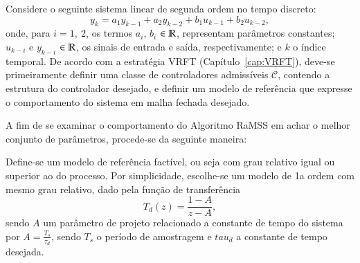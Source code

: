 \begin{exmp}\label{ex:sis2aord}
    Considere o seguinte sistema linear de segunda ordem no tempo discreto:
    \begin{equation}
    \label{eq:sis2aord}
        y_k = a_1y_{k-1} + a_2y_{k-2} + b_1u_{k-1} + b_2u_{k-2},
    \end{equation}
    onde, para $i = 1,\ 2$, os termos $a_i$, $b_i$ $\in \mathbb{R}$, representam parâmetros constantes; $u_{k-i}$ e $y_{k-i}$ $\in \mathbb{R}$, os sinais de entrada e saída, respectivamente; e $k$ o índice temporal.
    De acordo com a estratégia VRFT (Capítulo~\ref{cap:VRFT}), deve-se primeiramente definir uma classe de controladores admissíveis $\mathscr{C}$, contendo a estrutura do controlador desejado, e definir um modelo de referência que expresse o comportamento do sistema em malha fechada desejado.

    A fim de se examinar o comportamento do Algoritmo RaMSS em achar o melhor conjunto de parâmetros, procede-se da seguinte maneira:

    Define-se um modelo de referência 
    factível, ou seja com grau relativo igual ou superior ao do processo. Por simplicidade, escolhe-se um modelo de 1a ordem com mesmo grau relativo, dado pela função de transferência
 \begin{equation}
    T_d(z) = \frac{1-A}{z-A},
    \label{eq:mr_sis2aord}
 \end{equation}
    sendo $A$ um parâmetro de projeto relacionado a constante de tempo do sistema por  $A = \frac{T_s}{\tau_d}$, sendo $T_s$ o período de amostragem e $tau_d$ a constante de tempo desejada.


\end{exmp}
